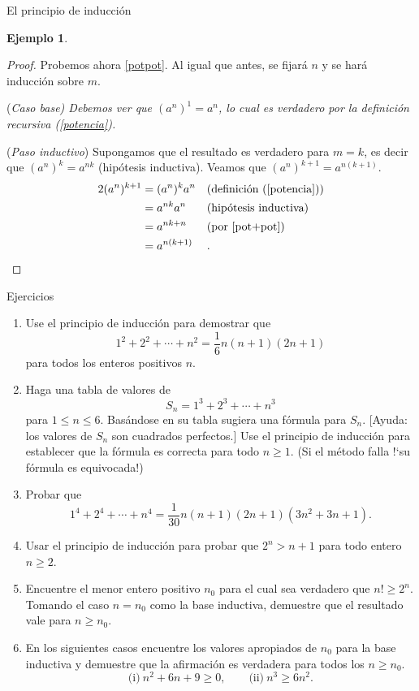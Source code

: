 \documentclass[11pt,spanish,makeidx]{amsbook}
\theoremstyle{definition}
\newtheorem{ejemplo}{Ejemplo}[section]
\theoremstyle{remark}
\begin{document}
\begin{section}{El principio de inducción}
\begin{ejemplo}
\begin{proof}
Probemos ahora \ref{potpot}. Al igual que antes, se fijará $n$ y se hará inducción sobre $m$.

\noindent(\it Caso  base\rm) Debemos ver que $(a^n)^1 = a^n$, lo cual es verdadero por la definición recursiva (\ref{potencia}). 

\noindent ({\it Paso  inductivo}) Supongamos que el resultado es verdadero para $m=k$, es decir que  $(a^n)^k = a^{nk}$ (hipótesis inductiva). Veamos que  $(a^n)^{k+1} = a^{n(k+1)}$. 
\begin{alignat*}2
(a^n)^{k+1} &= (a^n)^{k}a^n&  & \text{(definición (\ref{potencia}))} \\
&= a^{nk}a^n& & \text{(hipótesis inductiva)} \\
&= a^{nk+n}&  & \text{(por \ref{pot+pot})}\\
&= a^{n(k+1)}&  &.  
\end{alignat*}

\end{proof}
\end{ejemplo}

\begin{subsection}{Ejercicios}
\begin{enumerate}
\item Use el principio de inducción para demostrar que
$$
1^2+2^2+\cdots +n^2 = \frac16 n(n+1)(2n +1)
$$
para todos los enteros positivos $n$.
\item Haga una tabla de valores de
$$
S_n = 1^3+2^3+\cdots +n^3
$$
para $1 \le n\le 6$. Basándose en su tabla sugiera una fórmula para $S_n$. [Ayuda: los valores de $S_n$ son cuadrados perfectos.] Use el principio de inducción para establecer que la fórmula es correcta para todo $n\ge 1$. (Si el método falla !`su fórmula es equivocada!)
\item Probar que
$$
1^4+2^4+\cdots+n^4= \frac{1}{30}n(n+1)(2n+1)(3n^2+3n+1).
$$
\item Usar el principio de inducción para probar que $2^n>n+1$ para todo entero $n\ge2$.
\item Encuentre el menor entero positivo $n_0$ para el cual sea verdadero que $n! \ge 2^n$. Tomando el caso $n=n_0$ como la base inductiva, demuestre que el resultado vale para $n\ge n_0$.
\item En los siguientes casos encuentre los valores apropiados de $n_0$ para la base inductiva y demuestre que la afirmación es verdadera para todos los $n\ge n_0$.
$$
\text{(i)} \ n^2 +6n + 9 \ge 0, \qquad \text{(ii)} \ n^3 \ge 6n^2.
$$
\end{enumerate}
\end{subsection}
\end{section}
\end{document}
